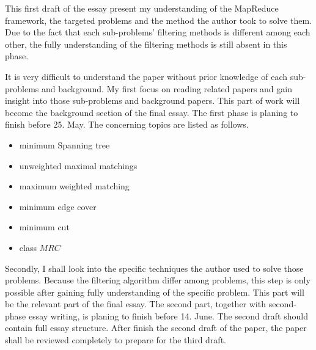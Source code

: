 \documentclass[a4paper,11pt]{article}
\begin{document}
This first draft of the essay present my understanding of the MapReduce framework, the targeted problems and the method the author took to solve them. Due to the fact that each sub-problems' filtering methods is different among each other, the fully understanding of the filtering methods is still absent in this phase. 

It is very difficult to understand the paper without prior knowledge of each sub-problems and background. My first focus on reading related papers and gain insight into those sub-problems and background papers. This part of work will become the background section of the final essay. The first phase is planing to finish before 25. May. The concerning topics are listed as follows.
\begin{itemize}
  \item minimum Spanning tree
  \item unweighted maximal matchings
  \item maximum weighted matching
  \item minimum edge cover
  \item minimum cut
  \item class $MRC$
\end{itemize}

Secondly, I shall look into the specific techniques the author used to solve those problems. Because the filtering algorithm differ among problems, this step is only possible after gaining fully understanding of the specific problem. This part will be the relevant part of the final essay. The second part, together with second-phase essay writing, is planing to finish before 14. June. The second draft should contain full essay structure. After finish the second draft of the paper, the paper shall be reviewed completely to prepare for the third draft.


\pagebreak %

 
\end{document}
